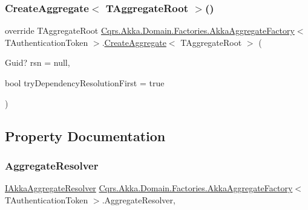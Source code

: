 \subsubsection{\texorpdfstring{Create\+Aggregate$<$ T\+Aggregate\+Root $>$()}{CreateAggregate< TAggregateRoot >()}}
{\footnotesize\ttfamily override T\+Aggregate\+Root \hyperlink{classCqrs_1_1Akka_1_1Domain_1_1Factories_1_1AkkaAggregateFactory}{Cqrs.\+Akka.\+Domain.\+Factories.\+Akka\+Aggregate\+Factory}$<$ T\+Authentication\+Token $>$.\hyperlink{classCqrs_1_1Domain_1_1Factories_1_1AggregateFactory_aa60839e14ef01b3971067e1f154ee6b4}{Create\+Aggregate}$<$ T\+Aggregate\+Root $>$ (\begin{DoxyParamCaption}\item[{Guid?}]{rsn = {\ttfamily null},  }\item[{bool}]{try\+Dependency\+Resolution\+First = {\ttfamily true} }\end{DoxyParamCaption})}



\subsection{Property Documentation}
\mbox{\label{classCqrs_1_1Akka_1_1Domain_1_1Factories_1_1AkkaAggregateFactory_ae83aa4aa5cbe5fe0cc0cea41de002218}} 
\subsubsection{\texorpdfstring{Aggregate\+Resolver}{AggregateResolver}}
{\footnotesize\ttfamily \hyperlink{interfaceCqrs_1_1Akka_1_1Domain_1_1IAkkaAggregateResolver}{I\+Akka\+Aggregate\+Resolver} \hyperlink{classCqrs_1_1Akka_1_1Domain_1_1Factories_1_1AkkaAggregateFactory}{Cqrs.\+Akka.\+Domain.\+Factories.\+Akka\+Aggregate\+Factory}$<$ T\+Authentication\+Token $>$.Aggregate\+Resolver\hspace{0.3cm}{\ttfamily [get]}, {\ttfamily [protected]}}

